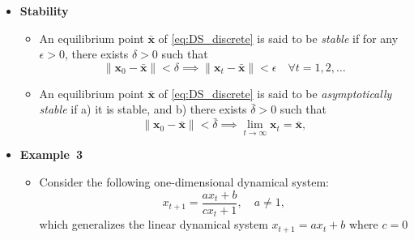 \documentclass[12pt,a4paper]{article}
\begin{document}
\begin{itemize}
\item \textbf{Stability}
  \begin{itemize}

  \item An equilibrium point $\bar{\bm{x}}$ of \eqref{eq:DS_discrete}
    is said to be \emph{stable} if
    for any $\epsilon >0$,
    there exists $\delta>0$ such that
    \begin{equation}\nonumber%
      \lVert \bm{x}_{0} - \bar{\bm{x}} \rVert < \delta
      \implies 
      \lVert \bm{x}_{t} - \bar{\bm{x}} \rVert < \epsilon \quad \forall t = 1, 2, \ldots
    \end{equation}
  \item An equilibrium point $\bar{\bm{x}}$ of \eqref{eq:DS_discrete}
    is said to be \emph{asymptotically stable} if
    a) it is stable, and b)
    there exists $\bar{\delta}>0$ such that
    \begin{equation}\nonumber%
      \lVert \bm{x}_{0} - \bar{\bm{x}} \rVert < \bar{\delta}
      \implies 
      \lim_{t \to \infty}\bm{x}_{t} =  \bar{\bm{x}},
    \end{equation}
  \end{itemize}

\item \textbf{Example~3}
  \begin{itemize}
  \item Consider the following one-dimensional dynamical system:
    \begin{equation}\label{eq:ex3}%
      x_{t+1} = \frac{ax_{t}+b}{cx_{t}+1},
      \quad a \neq 1,
    \end{equation}
    which generalizes the linear dynamical system $x_{t+1} = ax_{t} + b$ where $c=0$


\end{itemize}
\end{itemize}
\end{document}

